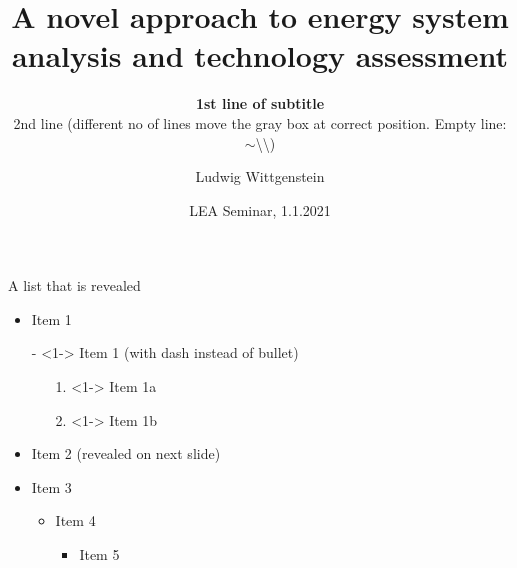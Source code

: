 \documentclass[aspectratio=169]{beamer}
\begin{document}
\title{A novel approach to energy system analysis and technology assessment}

\author[L.~Wittgenstein]{Ludwig Wittgenstein}


\subtitle{\textbf{1st line of subtitle}\\2nd line (different no of lines move the gray box at correct position. Empty line:  $\sim$\textbackslash\textbackslash)}

\date{LEA Seminar, 1.1.2021} %


\begin{frame}[plain] %
  \titlepage
\end{frame}


\begin{frame}{A list that is revealed}  
  \begin{itemize}
  \item<1-> Item 1
  \item[-]<1->  Item 1 (with dash instead of bullet)
    \begin{itemize}
    \item[1.]<1-> Item 1a
    \item[2.]<1-> Item 1b
    \end{itemize}
  \item<2->  Item 2 (revealed on next slide)
  \item<3-> Item 3
    \begin{itemize}
    \item<3-> Item 4
      \begin{itemize}
      \item<3-> Item 5
      \end{itemize}
    \end{itemize}
  \end{itemize}
 \vspace*{\fill} %
\end{frame}
\end{document}
